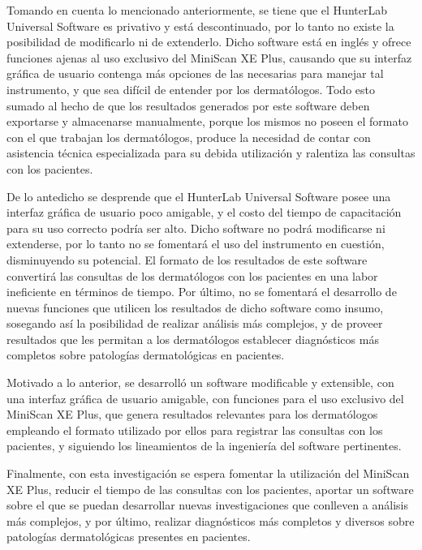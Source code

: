 Tomando en cuenta lo mencionado anteriormente, se tiene que el HunterLab Universal Software es privativo y est\'{a} descontinuado, por lo tanto no existe la posibilidad de modificarlo ni de extenderlo. Dicho software est\'{a} en ingl\'{e}s y ofrece funciones ajenas al uso exclusivo del MiniScan XE Plus, causando que su interfaz gr\'{a}fica de usuario contenga m\'{a}s opciones de las necesarias para manejar tal instrumento, y que sea dif\'{i}cil de entender por los dermat\'{o}logos. Todo esto sumado al hecho de que los resultados generados por este software deben exportarse y almacenarse manualmente, porque los mismos no poseen el formato con el que trabajan los dermat\'{o}logos, produce la necesidad de contar con asistencia t\'{e}cnica especializada para su debida utilizaci\'{o}n y ralentiza las consultas con los pacientes.

De lo antedicho se desprende que el HunterLab Universal Software posee una interfaz gr\'{a}fica de usuario poco amigable, y el costo del tiempo de capacitaci\'{o}n para su uso correcto podr\'{i}a ser alto. Dicho software no podr\'{a} modificarse ni extenderse, por lo tanto no se fomentar\'{a} el uso del instrumento en cuesti\'{o}n, disminuyendo su potencial. El formato de los resultados de este software convertir\'{a} las consultas de los dermat\'{o}logos con los pacientes en una labor ineficiente en t\'{e}rminos de tiempo. Por \'{u}ltimo, no se fomentar\'{a} el desarrollo de nuevas funciones que utilicen los resultados de dicho software como insumo, sosegando as\'{i} la posibilidad de realizar an\'{a}lisis m\'{a}s complejos, y de proveer resultados que les permitan a los dermat\'{o}logos establecer diagn\'{o}sticos m\'{a}s completos sobre patolog\'{i}as dermatol\'{o}gicas en pacientes.

Motivado a lo anterior, se desarroll\'{o} un software modificable y extensible, con una interfaz gr\'{a}fica de usuario amigable, con funciones para el uso exclusivo del MiniScan XE Plus, que genera resultados relevantes para los dermat\'{o}logos empleando el formato utilizado por ellos para registrar las consultas con los pacientes, y siguiendo los lineamientos de la ingenier\'{i}a del software pertinentes.

Finalmente, con esta investigaci\'{o}n se espera fomentar la utilizaci\'{o}n del \mbox{MiniScan} XE Plus, reducir el tiempo de las consultas con los pacientes, aportar un software sobre el que se puedan desarrollar nuevas investigaciones que conlleven a an\'{a}lisis m\'{a}s complejos, y por \'{u}ltimo, realizar diagn\'{o}sticos m\'{a}s completos y diversos sobre patolog\'{i}as dermatol\'{o}gicas presentes en pacientes.

